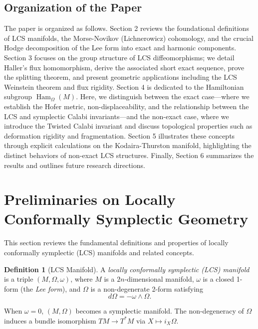 \documentclass[11pt,a4paper]{amsart}
\theoremstyle{definition}
\newtheorem{definition}[theorem]{Definition}
\theoremstyle{remark}
\newcommand{\Ham}{\operatorname{Ham}}
\begin{document}
	\subsection*{Organization of the Paper}
	The paper is organized as follows. Section 2 reviews the foundational definitions of LCS manifolds, the Morse-Novikov (Lichnerowicz) cohomology, and the crucial Hodge decomposition of the Lee form into exact and harmonic components. Section 3 focuses on the group structure of LCS diffeomorphisms; we detail Haller's flux homomorphism, derive the associated short exact sequence, prove the splitting theorem, and present geometric applications including the LCS Weinstein theorem and flux rigidity. Section 4 is dedicated to the Hamiltonian subgroup $\Ham_\Omega(M)$. Here, we distinguish between the exact case—where we establish the Hofer metric, non-displaceability, and the relationship between the LCS and symplectic Calabi invariants—and the non-exact case, where we introduce the Twisted Calabi invariant and discuss topological properties such as deformation rigidity and fragmentation. Section 5 illustrates these concepts through explicit calculations on the Kodaira-Thurston manifold, highlighting the distinct behaviors of non-exact LCS structures. Finally, Section 6 summarizes the results and outlines future research directions.
	
	
	\section{Preliminaries on Locally Conformally Symplectic Geometry}
	
	This section reviews the fundamental definitions and properties of locally conformally symplectic (LCS) manifolds and related concepts.
	
	\begin{definition}[LCS Manifold]
		A \emph{locally conformally symplectic (LCS) manifold} is a triple $(M, \Omega, \omega)$, where $M$ is a $2n$-dimensional manifold, $\omega$ is a closed 1-form (the \emph{Lee form}), and $\Omega$ is a non-degenerate 2-form satisfying
		\[
		d\Omega = -\omega \wedge \Omega.
		\]
	\end{definition}
	
	When $\omega = 0$, $(M, \Omega)$ becomes a symplectic manifold. The non-degeneracy of $\Omega$ induces a bundle isomorphism $TM \to T^*M$ via $X \mapsto i_X \Omega$.
	
\end{document}
